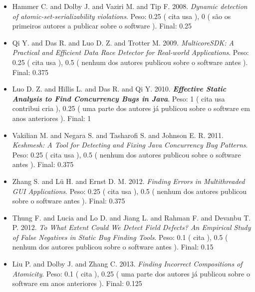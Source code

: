 \begin{itemize}
\item Hammer C. and Dolby J. and Vaziri M. and Tip F.
      2008.
        \textit{ Dynamic detection of atomic-set-serializability violations}.
      Peso:
      0.25 (
          cita
          usa
      ),
      0 (
são os primeiros autores a publicar sobre o software
      ).
      Final:
      0.25

\item Qi Y. and Das R. and Luo D. Z. and Trotter M.
      2009.
        \textit{ MulticoreSDK: A Practical and Efficient Data Race Detector for Real-world Applications}.
      Peso:
      0.25 (
          cita
          usa
      ),
      0.5 (
nenhum dos autores publicou sobre o software antes
      ).
      Final:
      0.375

\item Luo D. Z. and Hillis L. and Das R. and Qi Y.
      2010.
        \textbf{\textit{ Effective Static Analysis to Find Concurrency Bugs in Java}}.
      Peso:
      1 (
          cita
          usa
          contribui
          cria
      ),
      0.25 (
uma parte dos autores já publicou sobre o software em anos anteriores
      ).
      Final:
      1

\item Vakilian M. and Negara S. and Tasharofi S. and Johnson E. R.
      2011.
        \textit{ Keshmesh: A Tool for Detecting and Fixing Java Concurrency Bug Patterns}.
      Peso:
      0.25 (
          cita
          usa
      ),
      0.5 (
nenhum dos autores publicou sobre o software antes
      ).
      Final:
      0.375

\item Zhang S. and L\"{u} H. and Ernst D. M.
      2012.
        \textit{ Finding Errors in Multithreaded GUI Applications}.
      Peso:
      0.25 (
          cita
          usa
      ),
      0.5 (
nenhum dos autores publicou sobre o software antes
      ).
      Final:
      0.375

\item Thung F. and Lucia and Lo D. and Jiang L. and Rahman F. and Devanbu T. P.
      2012.
        \textit{ To What Extent Could We Detect Field Defects? An Empirical Study of False Negatives in Static Bug Finding Tools}.
      Peso:
      0.1 (
          cita
      ),
      0.5 (
nenhum dos autores publicou sobre o software antes
      ).
      Final:
      0.15

\item Liu P. and Dolby J. and Zhang C.
      2013.
        \textit{ Finding Incorrect Compositions of Atomicity}.
      Peso:
      0.1 (
          cita
      ),
      0.25 (
uma parte dos autores já publicou sobre o software em anos anteriores
      ).
      Final:
      0.125


\end{itemize}
